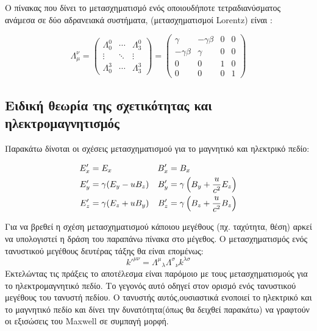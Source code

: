 Ο πίνακας που δίνει το  μετασχηματισμό ενός οποιουδήποτε τετραδιανύσματος ανάμεσα σε δύο αδρανειακά συστήματα, (μετασχηματισμοί \textlatin{Lorentz}) είναι : 

\begin{equation}
  \Lambda_\mu ^\nu=
  \begin{pmatrix}
    \Lambda^0 _0  & \cdots & \Lambda^0 _3 \\
    \vdots & \ddots & \vdots \\
    \Lambda^3 _0  & \cdots & \Lambda^3 _3
  \end{pmatrix}
  =
  \begin{pmatrix}
    \gamma & -\gamma \beta& 0 & 0 \\
    -\gamma \beta & \gamma & 0 & 0 \\
    0 & 0 & 1 & 0 \\
    0 & 0 & 0 & 1
  \end{pmatrix} 
\end{equation}

\subsection{Ειδική θεωρία της σχετικότητας και ηλεκτρομαγνητισμός }
Παρακάτω δίνοται οι σχέσεις μετασχηματισμού για το μαγνητικό και ηλεκτρικό πεδίο:

\begin{align*} 
  E'_x &= E_x        & B'_x &= B_x   
  \\E'_y &= \gamma(E_y-u B_z)         & B'_y &= \gamma \left(  B_y+\frac{u}{c^2}E_z \right)   
  \\E'_z &= \gamma(E_z+u B_y)        & B'_z &= \gamma \left(  B_z+\frac{u}{c^2}B_z \right)    
\end{align*} 

Για να βρεθεί η σχέση μετασχηματισμού κάποιου μεγέθους (πχ. ταχύτητα, θέση) αρκεί να υπολογιστεί η δράση του παραπάνω πίνακα στο μέγεθος. Ο μετασχηματισμός ενός τανυστικού μεγέθους δευτέρας τάξης θα είναι επομένως:
\[
k'^{\mu \nu}= {\Lambda^{\mu}}_{\lambda} {\Lambda^{\sigma}}_{\nu} k^{\lambda \sigma} 
\]
Εκτελώντας τις πράξεις το αποτέλεσμα είναι παρόμοιο με τους μετασχηματισμούς για το ηλεκτρομαγνητικό πεδίο. Το γεγονός αυτό οδηγεί στον ορισμό ενός τανυστικού μεγέθους του τανυστή πεδίου. Ο τανυστής αυτός,ουσιαστικά ενοποιεί το ηλεκτρικό και το μαγνητικό πεδίο και δίνει την δυνατότητα(όπως θα δειχθεί παρακάτω) να γραφτούν οι εξισώσεις του \textlatin{Maxwell} σε συμπαγή μορφή.

